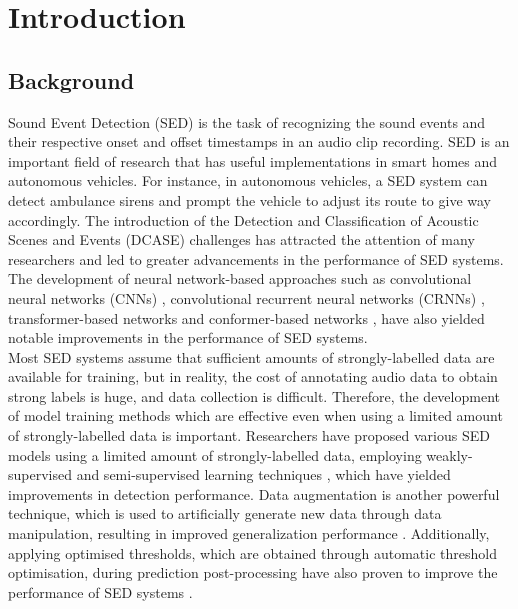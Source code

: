 \linespread{1.3}
\chapter{Introduction}
\section{Background}
Sound Event Detection (SED) is the task of recognizing the sound events and their respective onset and offset timestamps in an audio clip recording. SED is an important field of research that has useful implementations in smart homes and autonomous vehicles. For instance, in autonomous vehicles, a SED system can detect ambulance sirens and prompt the vehicle to adjust its route to give way accordingly. The introduction of the Detection and Classification of Acoustic Scenes and Events (DCASE) challenges has attracted the attention of many researchers and led to greater advancements in the performance of SED systems. The development of neural network-based approaches such as convolutional neural networks (CNNs) \cite{kong2020sound}, convolutional recurrent neural networks (CRNNs) \cite{xu2017convolutional}, transformer-based networks \cite{Miyazaki2020CONFORMERBASEDSE} and conformer-based networks \cite{Miyazaki2020CONFORMERBASEDSE}, have also yielded notable improvements in the performance of SED systems.\\ 


Most SED systems assume that sufficient amounts of strongly-labelled data are available for training, but in reality, the cost of annotating audio data to obtain strong labels is huge, and data collection is difficult. Therefore, the development of model training methods which are effective even when using a limited amount of strongly-labelled data is important. Researchers have proposed various SED models using a limited amount of strongly-labelled data, employing weakly-supervised and semi-supervised learning techniques \cite{Miyazaki2020CONFORMERBASEDSE}, which have yielded improvements in detection performance.
Data augmentation is another powerful technique, which is used to artificially generate new data through data manipulation, resulting in improved generalization performance \cite{Wei_2020}. Additionally, applying optimised thresholds, which are obtained through automatic threshold optimisation, during prediction post-processing have also proven to improve the performance of SED systems \cite{kong2020sound}.\\


